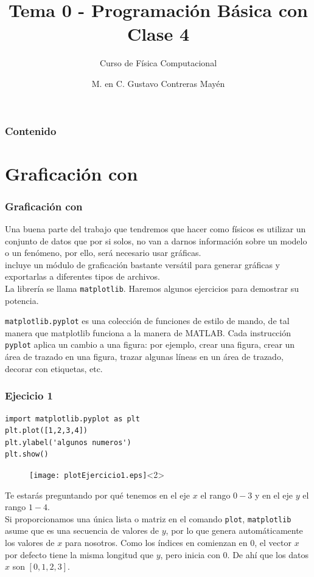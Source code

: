 


\title{Tema 0 - Programación Básica con \python \\ Clase 4}
\subtitle{Curso de Física Computacional}
\author[]{M. en C. Gustavo Contreras Mayén}
\date{ }
\maketitle
\fontsize{14}{14}\selectfont
{}
\begin{frame}
\frametitle{Contenido}
\tableofcontents[pausesections]
\end{frame}
\section{Graficación con \python}
\begin{frame}
\frametitle{Graficación con \python}
Una buena parte del trabajo que tendremos que hacer como físicos es utilizar un conjunto de datos que por si solos, no van a darnos información sobre un modelo o un fenómeno, por ello, será necesario usar gráficas.
\\
\medskip
\python incluye un módulo de graficación bastante versátil para generar gráficas y exportarlas a diferentes tipos de archivos.
\\
\medskip
La librería se llama \texttt{matplotlib}. Haremos algunos ejercicios para demostrar su potencia.
\end{frame}
\begin{frame}
\texttt{matplotlib.pyplot} es una colección de funciones de estilo de mando, de tal manera que matplotlib funciona a la manera de MATLAB. Cada instrucción \texttt{pyplot} aplica un cambio a una figura: por ejemplo, crear una figura, crear un área de trazado en una figura, trazar algunas líneas en un área de trazado, decorar con etiquetas, etc.
\end{frame}
\begin{frame}[fragile]
\frametitle{Ejecicio 1}
\begin{lstlisting}
import matplotlib.pyplot as plt
plt.plot([1,2,3,4])
plt.ylabel('algunos numeros')
plt.show()
\end{lstlisting}
\begin{figure}
	\centering
	\texttt{[image: plotEjercicio1.eps]}<2> 
\end{figure}
\end{frame}
\begin{frame}
Te estarás preguntando por qué tenemos en el eje $x$ el rango $0-3$ y en el eje $y$ el rango  $1-4$.
\\
\medskip
\pause
Si proporcionamos una única lista o matriz en el comando \texttt{plot}, \texttt{matplotlib} asume que es una secuencia de valores de $y$, por lo que genera automáticamente los valores de $x$ para nosotros. Como los índices en \python comienzan en $0$, el vector $x$ por defecto tiene la misma longitud que $y$, pero inicia con 0. De ahí que los datos $x$ son $[0,1,2,3]$.
\end{frame}
